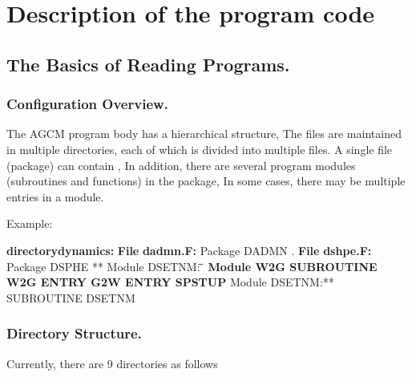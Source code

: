 \hypertarget{description-of-the-program-code}{%
\section{Description of the program
code}\label{description-of-the-program-code}}

\hypertarget{the-basics-of-reading-programs.}{%
\subsection{The Basics of Reading
Programs.}\label{the-basics-of-reading-programs.}}

\hypertarget{configuration-overview.}{%
\subsubsection{Configuration Overview.}\label{configuration-overview.}}

The AGCM program body has a hierarchical structure, The files are
maintained in multiple directories, each of which is divided into
multiple files. A single file (package) can contain , In addition, there
are several program modules (subroutines and functions) in the package,
In some cases, there may be multiple entries in a module.

Example:

{\textbf{directory}}\textbf{dynamics: } {\textbf{File}} \textbf{dadmn.F:
} \blanket* Package DADMN . {\textbf{File}} \textbf{dshpe.F: }
\blanket* Package DSPHE ** Module DSETNM: \textbf{̄ {\textbf{Module
W2G}} SUBROUTINE W2G ENTRY G2W ENTRY SPSTUP } Module DSETNM:**
SUBROUTINE DSETNM

\hypertarget{directory-structure.}{%
\subsubsection{Directory Structure.}\label{directory-structure.}}

Currently, there are 9 directories as follows

